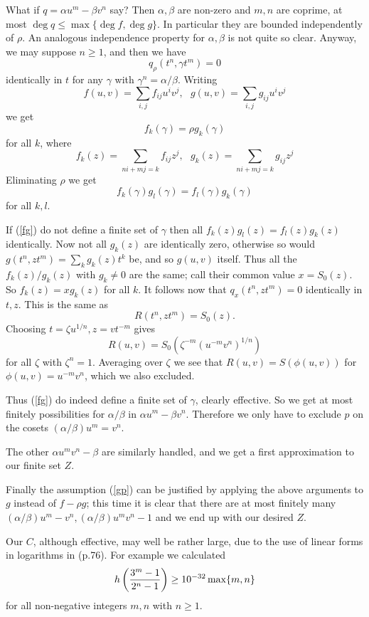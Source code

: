 \documentclass[leqno,12pt]{article} %
\theoremstyle{plain} %
\theoremstyle{definition} %
\begin{document}
What if $q = \alpha u^m-\beta v^n$ say? Then  $\alpha,\beta$ are non-zero and $m,n$ are coprime, at
most $\deg q \leq \max\{\deg f, \deg g\}$. In particular they are bounded independently of $\rho$. An
analogous independence property for $\alpha,\beta$ is not quite so clear. Anyway, we may suppose
$n \geq 1$, and then we have
$$q_\rho(t^n,\gamma t^m) = 0$$
identically in $t$ for any $\gamma$ with $\gamma^n=\alpha/\beta$. Writing
$$f(u,v) = \sum_{i,j}f_{ij}u^iv^j,    ~~~g(u,v) = \sum_{i,j}g_{ij}u^iv^j$$
we get
$$f_k(\gamma)=\rho g_k(\gamma)$$
for all $k$, where
$$f_k(z) = \sum_{ni+mj=k}f_{ij}z^j,    ~~~g_k(z) = \sum_{ni+mj=k}g_{ij}z^j$$
Eliminating $\rho$ we get
\begin{equation}\label{fg}
f_k(\gamma)g_l(\gamma)=f_l(\gamma)g_k(\gamma)
\end{equation}
for all $k,l$.

If (\ref{fg}) do not define a finite set of $\gamma$ then all $f_k(z)g_l(z) = f_l(z)g_k(z)$ identically. Now
not all $g_k(z)$ are identically zero, otherwise so would $g(t^n,zt^m) = \sum_k g_k(z)t^k$ be, and so
$g(u,v)$ itself. Thus all the $f_k(z)/g_k(z)$ with $g_k \neq 0$ are the same; call their common value
$x = S_0(z)$. So $f_k(z) = xg_k(z)$ for all $k$. It follows now that $q_x(t^n,zt^m) = 0$ identically in
$t,z$. This is the same as
$$R(t^n, zt^m) = S_0(z).$$
Choosing $t = \zeta u^{1/n}, z = vt^{-m}$ gives
$$R(u,v) = S_0(\zeta^{-m}(u^{-m}v^n)^{1/n})$$
for all $\zeta$ with $\zeta^n = 1$. Averaging over $\zeta$ we see that $R(u,v) = S(\phi(u,v))$ for $\phi(u,v) = u^{-m}v^n$, which we also excluded.

Thus (\ref{fg}) do indeed define a finite set of $\gamma$, clearly effective. So we get at most finitely
possibilities for $\alpha/\beta$ in $\alpha u^m-\beta v^n$. Therefore we only have to exclude $p$ on the cosets $(\alpha/\beta)u^m=v^n$.

The other $\alpha u^mv^n-\beta$ are similarly handled, and we get a first approximation to our finite set $Z$.

Finally the assumption (\ref{gp}) can be justified by applying the above arguments to $g$
instead of $f-\rho g$; this time it is clear that there are at most finitely many $(\alpha/\beta)u^m-v^n, (\alpha/\beta)u^mv^n-1$ and we end up with our desired $Z$. 

Our $C$, although effective, may well be rather large, due to the use of linear forms in
logarithms in \cite{BEGP} (p.76). For example we calculated
$$h\left({3^m-1 \over 2^n-1}\right) \geq 10^{-32}\max\{m,n\}$$
for all non-negative integers $m,n$ with $n \geq 1$.
\end{document}
